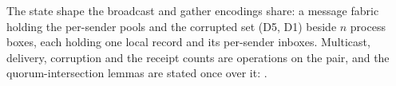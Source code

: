 \begin{definition}
  \label{def:aba-fabric}
  \leanok
  The state shape the broadcast and gather encodings share: a message fabric holding the per-sender pools and the corrupted set (D5, D1) beside $n$ process boxes, each holding one local record and its per-sender inboxes.
  Multicast, delivery, corruption and the receipt counts are operations on the pair, and the quorum-intersection lemmas are stated once over it: .
\end{definition}
